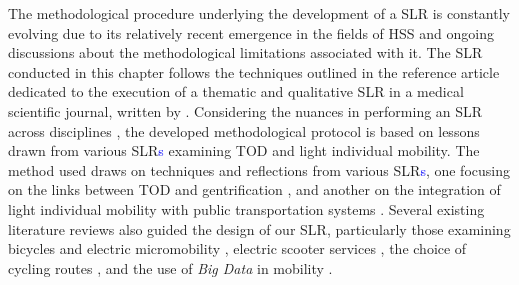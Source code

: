\begin{refsegment}
The methodological procedure underlying the development of a \acrshort{SLR} is constantly evolving due to its relatively recent emergence in the fields of \acrshort{HSS} and ongoing discussions about the methodological limitations associated with it. The \acrshort{SLR} conducted in this chapter follows the techniques outlined in the reference article dedicated to the execution of a thematic and qualitative \acrshort{SLR} in a medical scientific journal, written by \textcolor{blue}{\textcite[3-7]{thomas_methods_2008}}. Considering the nuances in performing an \acrshort{SLR} across disciplines \textcolor{blue}{\autocite[738]{padeiro_transit-oriented_2019}}, the developed methodological protocol is based on lessons drawn from various \acrshort{SLR}\textcolor{blue}{s} examining \acrshort{TOD} and light individual mobility. The method used draws on techniques and reflections from various \acrshort{SLR}\textcolor{blue}{s}, one focusing on the links between \acrshort{TOD} and gentrification \textcolor{blue}{\autocite[738]{padeiro_transit-oriented_2019}}, and another on the integration of light individual mobility with public transportation systems \textcolor{blue}{\autocite[4]{oeschger_micromobility_2020}}. Several existing literature reviews also guided the design of our \acrshort{SLR}, particularly those examining bicycles and electric micromobility \textcolor{blue}{\autocite[3]{sengul_impacts_2021}}, electric scooter services \textcolor{blue}{\autocite[4]{bozzi_shared_2021}}, the choice of cycling routes \textcolor{blue}{\autocite[2]{pritchard_revealed_2018}}, and the use of \textsl{Big Data} in mobility \textcolor{blue}{\autocite[36]{neilson_systematic_2019}}.%


\end{refsegment}
